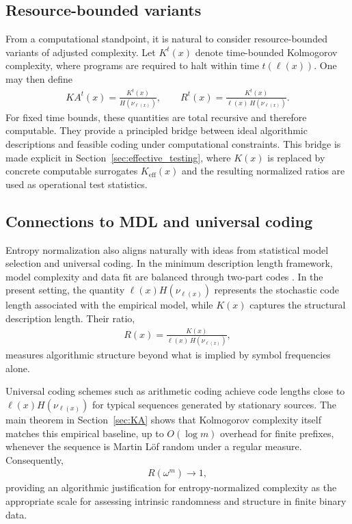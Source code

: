 \documentclass[12pt]{article}
\newcommand{\be}{\begin{eqnarray}}
\newcommand{\ee}{\end{eqnarray}}
\begin{document}
\subsection*{Resource-bounded variants}

From a computational standpoint, it is natural to consider resource-bounded
variants of adjusted complexity. Let $K^{t}(x)$ denote time-bounded Kolmogorov
complexity, where programs are required to halt within time $t(\ell(x))$. One
may then define
\be
KA^{t}(x)=\frac{K^{t}(x)}{H(\nu_{\ell(x)})},
\qquad
R^{t}(x)=\frac{K^{t}(x)}{\ell(x)\,H(\nu_{\ell(x)})}.
\label{eq:time_bounded_adjusted}
\ee
For fixed time bounds, these quantities are total recursive and therefore
computable. They provide a principled bridge between ideal algorithmic
descriptions and feasible coding under computational constraints. This bridge
is made explicit in Section~\ref{sec:effective_testing}, where $K(x)$ is
replaced by concrete computable surrogates $K_{\mathrm{eff}}(x)$ and the
resulting normalized ratios are used as operational test statistics.

\subsection*{Connections to MDL and universal coding}

Entropy normalization also aligns naturally with ideas from statistical model
selection and universal coding. In the minimum description length framework,
model complexity and data fit are balanced through two-part codes
\citep{Rissanen1978,BarronRissanenYu1998,BarronClarke1990}. In the present
setting, the quantity $\ell(x)H(\nu_{\ell(x)})$ represents the stochastic code
length associated with the empirical model, while $K(x)$ captures the
structural description length. Their ratio,
\be
R(x)=\frac{K(x)}{\ell(x)\,H(\nu_{\ell(x)})},
\label{eq:R_MDL}
\ee
measures algorithmic structure beyond what is implied by symbol frequencies
alone.

Universal coding schemes such as arithmetic coding achieve code lengths close
to $\ell(x)H(\nu_{\ell(x)})$ for typical sequences generated by stationary
sources. The main theorem in Section~\ref{sec:KA} shows that Kolmogorov
complexity itself matches this empirical baseline, up to $O(\log m)$ overhead
for finite prefixes, whenever the sequence is Martin L\"of random under a
regular measure. Consequently,
\be
R(\omega^{m})\to 1,
\ee
providing an algorithmic justification for entropy-normalized complexity as the
appropriate scale for assessing intrinsic randomness and structure in finite
binary data.
\end{document}
